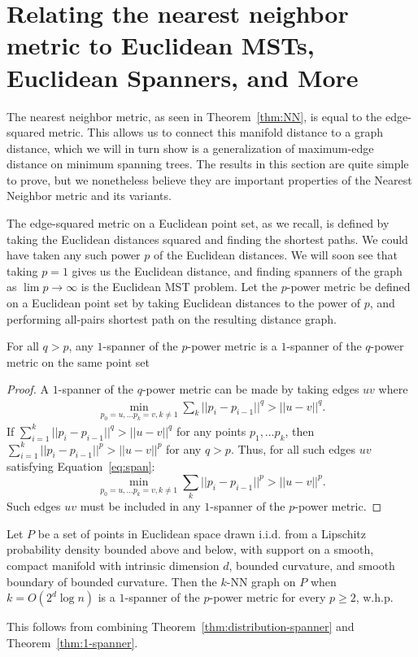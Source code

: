 \section{Relating the nearest neighbor metric to Euclidean MSTs,
Euclidean Spanners, and More}\label{sec:edge-power}
The nearest neighbor metric, as seen in Theorem~\ref{thm:NN}, is equal to
the edge-squared metric. This allows us to connect this manifold distance
to a graph distance, which we will in turn show is a generalization of
maximum-edge distance on minimum spanning trees. The results in this
section are quite simple to prove, but we nonetheless believe they are important
properties of the Nearest Neighbor metric and its variants.

The edge-squared metric on a Euclidean point set, as we recall, is defined by taking the
Euclidean distances squared and finding the shortest paths. 
We could have taken any such power $p$ of the Euclidean distances. We
will soon see that taking $p = 1$ gives us the Euclidean distance, and
finding spanners of the graph as $\lim p\rightarrow \infty$ is the
Euclidean MST problem.  
Let the $p$-power metric be defined on a Euclidean point set by taking
Euclidean distances to the power of $p$, and performing all-pairs
shortest path on the resulting distance graph.
\begin{theorem} \label{thm:1-spanner}
For all $q > p$, any $1$-spanner of the $p$-power metric is a
$1$-spanner of the $q$-power metric on the same point set
\end{theorem}
\begin{proof}
A $1$-spanner of the $q$-power metric can be made by taking
  edges $uv$ where
  \begin{align}\label{eq:span}
    \min_{p_0=u, \ldots p_k=v, k \not= 1} \sum_k ||p_i - p_{i-1}||^q > || u -
v||^q.
  \end{align}
If
  $\sum_{i=1}^k ||p_i - p_{i-1}||^q > || u - v||^q$ for any points
  $p_1, \ldots p_k$, then
  $\sum_{i=1}^k ||p_i - p_{i-1}||^p > || u - v||^p$ for any $q > p$.
  Thus, for all such edges $uv$ satisfying
  Equation~\ref{eq:span}:
  \[ \min_{p_0=u, \ldots p_k=v, k \not= 1} \sum_k ||p_i - p_{i-1}||^p > || u -
  v||^p. \] Such edges $uv$ must be included in any $1$-spanner
  of the $p$-power
  metric.
\end{proof}

 \begin{corollary}
   Let $P$ be a set of points in Euclidean space drawn i.i.d. from a Lipschitz
   probability density bounded above and below, with support on a
   smooth, compact manifold with intrinsic dimension $d$, bounded
   curvature, and
   smooth boundary of bounded curvature. Then the $k$-NN graph on $P$
   when $k = O(2^d \log n)$ is a $1$-spanner of the $p$-power
   metric for every $p \geq 2$, w.h.p.
 \end{corollary}
This follows from combining Theorem~\ref{thm:distribution-spanner} and
Theorem~\ref{thm:1-spanner}.
